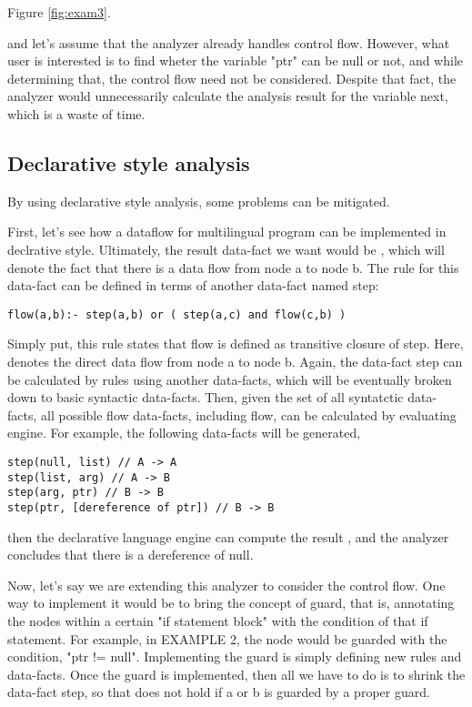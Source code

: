 Figure \ref{fig:exam3}.

and let's assume that the analyzer already handles control flow.
However, what user is interested is to find wheter the variable "ptr"
can be null or not, and while determining that, the control flow need
not be considered. Despite that fact, the analyzer would unnecessarily
calculate the analysis result for the variable next, which is a waste
of time.

\subsection{Declarative style analysis}

By using declarative style analysis, some problems can be mitigated.

First, let's see how a dataflow for multilingual program can be implemented in
declrative style. Ultimately, the result data-fact we want would be ,
which will denote the fact that there is a data flow from node a to node b. The
rule for this data-fact can be defined in terms of another data-fact named
step:

\begin{lstlisting}[style=myDatalog,xleftmargin=2.5em]
flow(a,b):- step(a,b) or ( step(a,c) and flow(c,b) )
\end{lstlisting}

Simply put, this rule states that flow is defined as transitive closure of step.
Here,  denotes the direct data flow from node a to node b. Again, the
data-fact step can be calculated by rules using another data-facts, which will
be eventually broken down to basic syntactic data-facts. Then, given the set of
all syntatctic data-facts, all possible flow data-facts, including flow, can be
calculated by evaluating engine. For example, the following data-facts will be
generated,

\begin{lstlisting}[style=myDatalog,xleftmargin=2.5em]
step(null, list) // A -> A
step(list, arg) // A -> B
step(arg, ptr) // B -> B
step(ptr, [dereference of ptr]) // B -> B
\end{lstlisting}

then the declarative language engine can compute the result ,
and the analyzer concludes that there is a dereference of null.

Now, let's say we are extending this analyzer to consider the control flow.
One way to implement it would be to bring the concept of guard, that is,
annotating the nodes within a certain "if statement block" with the condition
of that if statement.  For example, in EXAMPLE 2, the  node
would be guarded with the condition, "ptr != null".  Implementing the guard is
simply defining new rules and data-facts. Once the guard is implemented, then
all we have to do is to shrink the data-fact step, so that  does not
hold if a or b is guarded by a proper guard.

